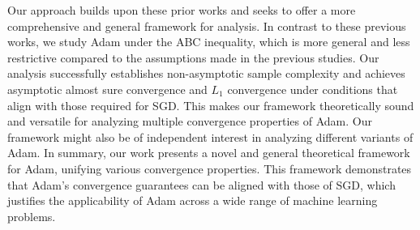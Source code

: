 \documentclass{article} %
\begin{document}
Our approach builds upon these prior works and seeks to offer a more comprehensive and general framework for analysis. In contrast to these previous works, we study Adam under the ABC inequality, which is more general and less restrictive compared to the assumptions made in the previous studies. Our analysis successfully establishes non-asymptotic sample complexity and achieves asymptotic almost sure convergence and $L_1$ convergence under conditions that align with those required for SGD. This makes our framework theoretically sound and versatile for analyzing multiple convergence properties of Adam. Our framework might also be of independent interest in analyzing different variants of Adam. In summary, our work presents a novel and general theoretical framework for Adam, unifying various convergence properties. This framework demonstrates that Adam's convergence guarantees can be aligned with those of SGD, which justifies the applicability of Adam across a wide range of machine learning problems.
\end{document}
